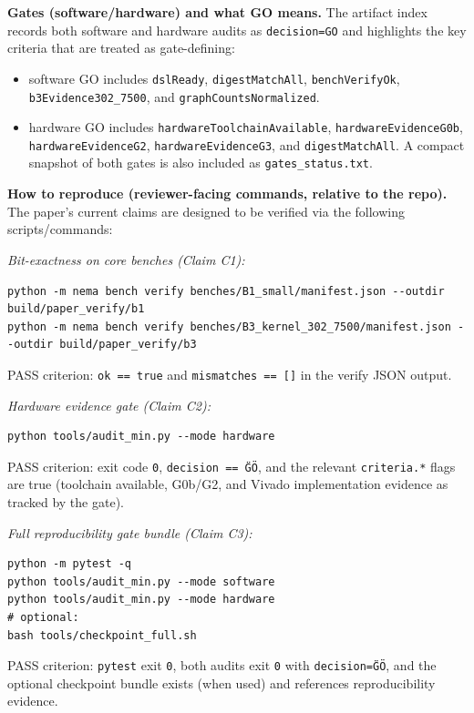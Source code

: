 \textbf{Gates (software/hardware) and what GO means.}
The artifact index records both software and hardware audits as \texttt{decision=GO} and highlights the key criteria that are treated as gate-defining:
\begin{itemize}
\item software GO includes \texttt{dslReady}, \texttt{digestMatchAll}, \texttt{benchVerifyOk}, \texttt{b3Evidence302\_7500}, and \texttt{graphCountsNormalized}.
\item hardware GO includes \texttt{hardwareToolchainAvailable}, \texttt{hardwareEvidenceG0b}, \texttt{hardwareEvidenceG2}, \texttt{hardwareEvidenceG3}, and \texttt{digestMatchAll}. A compact snapshot of both gates is also included as \texttt{gates\_status.txt}.
\end{itemize}

\textbf{How to reproduce (reviewer-facing commands, relative to the repo).}
The paper's current claims are designed to be verified via the following scripts/commands:

\textit{Bit-exactness on core benches (Claim C1):}
\begin{verbatim}
python -m nema bench verify benches/B1_small/manifest.json --outdir build/paper_verify/b1
python -m nema bench verify benches/B3_kernel_302_7500/manifest.json --outdir build/paper_verify/b3
\end{verbatim}

PASS criterion: \texttt{ok == true} and \texttt{mismatches == []} in the verify JSON output.

\textit{Hardware evidence gate (Claim C2):}
\begin{verbatim}
python tools/audit_min.py --mode hardware
\end{verbatim}

PASS criterion: exit code \texttt{0}, \texttt{decision == \"GO\"}, and the relevant \texttt{criteria.*} flags are true (toolchain available, G0b/G2, and Vivado implementation evidence as tracked by the gate).

\textit{Full reproducibility gate bundle (Claim C3):}
\begin{verbatim}
python -m pytest -q
python tools/audit_min.py --mode software
python tools/audit_min.py --mode hardware
# optional:
bash tools/checkpoint_full.sh
\end{verbatim}

PASS criterion: \texttt{pytest} exit \texttt{0}, both audits exit \texttt{0} with \texttt{decision=\"GO\"}, and the optional checkpoint bundle exists (when used) and references reproducibility evidence.

